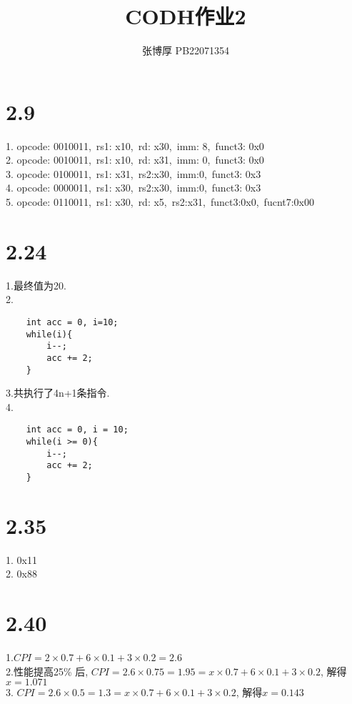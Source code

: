 \documentclass{article}
\title{CODH作业2}
\author{张博厚 PB22071354}
\date{}
\begin{document}
\maketitle
\section*{2.9}
1. opcode: 0010011,\ rs1: x10,\ rd: x30,\ imm: 8,\ funct3: 0x0\\
2. opcode: 0010011,\ rs1: x10,\ rd: x31,\ imm: 0,\ funct3: 0x0\\
3. opcode: 0100011,\ rs1: x31,\ rs2:x30,\ imm:0,\ funct3: 0x3\\
4. opcode: 0000011,\ rs1: x30,\ rs2:x30,\ imm:0,\ funct3: 0x3\\
5. opcode: 0110011,\ rs1: x30,\ rd: x5,\ rs2:x31,\ funct3:0x0,\ fucnt7:0x00

\section*{2.24}
1.最终值为20.\\
2.\begin{verbatim}
    int acc = 0, i=10;
    while(i){
        i--;
        acc += 2;
    }
\end{verbatim}
3.共执行了4n+1条指令.\\
4.\begin{verbatim}
    int acc = 0, i = 10;
    while(i >= 0){
        i--;
        acc += 2;
    }
\end{verbatim}

\section*{2.35}
1. 0x11\\
2. 0x88

\section*{2.40}
1.$CPI = 2\times0.7+ 6\times0.1 + 3\times0.2 = 2.6$\\
2.性能提高25\% 后, $CPI = 2.6\times0.75=1.95=x\times0.7+ 6\times0.1 + 3\times0.2 $,
解得$x=1.071$\\
3. $CPI = 2.6\times0.5=1.3=x\times0.7+ 6\times0.1 + 3\times0.2$,
解得$x=0.143$
\end{document}
